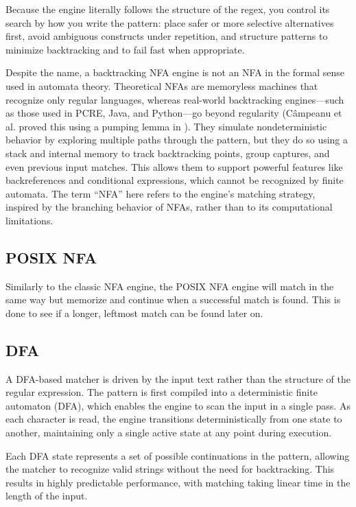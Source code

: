 Because the engine literally follows the structure of the regex, you control its search by how you write the pattern: place safer or more selective alternatives first, avoid ambiguous constructs under repetition, and structure patterns to minimize backtracking and to fail fast when appropriate.

Despite the name, a backtracking NFA engine is not an NFA in the formal sense used in automata theory. Theoretical NFAs are memoryless machines that recognize only regular languages, whereas real-world backtracking engines—such as those used in PCRE, Java, and Python—go beyond regularity (Câmpeanu et al. proved this using a pumping lemma in \cite{campeanu_reg_ereg}). They simulate nondeterministic behavior by exploring multiple paths through the pattern, but they do so using a stack and internal memory to track backtracking points, group captures, and even previous input matches. This allows them to support powerful features like backreferences and conditional expressions, which cannot be recognized by finite automata. The term “NFA” here refers to the engine’s matching strategy, inspired by the branching behavior of NFAs, rather than to its computational limitations.


\subsection{POSIX NFA}
Similarly to the classic NFA engine, the POSIX NFA engine will match in the same way but memorize and continue when a successful match is found. This is done to see if a longer, leftmost match can be found later on.

\subsection{DFA}
A DFA-based matcher is driven by the input text rather than the structure of the regular expression. The pattern is first compiled into a deterministic finite automaton (DFA), which enables the engine to scan the input in a single pass. As each character is read, the engine transitions deterministically from one state to another, maintaining only a single active state at any point during execution.

Each DFA state represents a set of possible continuations in the pattern, allowing the matcher to recognize valid strings without the need for backtracking. This results in highly predictable performance, with matching taking linear time in the length of the input.

